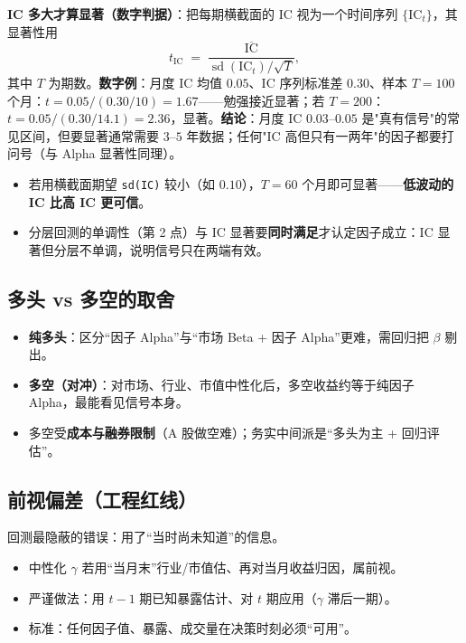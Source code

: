 \documentclass[UTF8,11pt]{ctexart}
\newcommand{\codeinl}[1]{\texttt{#1}}
\begin{document}
\textbf{IC 多大才算显著（数字判据）}：把每期横截面的 IC 视为一个时间序列 $\{\mathrm{IC}_t\}$，其显著性用
\begin{equation}
t_{\mathrm{IC}} \;=\; \frac{\overline{\mathrm{IC}}}{\operatorname{sd}(\mathrm{IC}_t)/\sqrt{T}},
\end{equation}
其中 $T$ 为期数。\textbf{数字例}：月度 IC 均值 $0.05$、IC 序列标准差 $0.30$、样本 $T=100$ 个月：$t=0.05/(0.30/10)=1.67$——勉强接近显著；若 $T=200$：$t=0.05/(0.30/14.1)=2.36$，显著。\textbf{结论}：月度 IC $0.03$--$0.05$ 是"真有信号"的常见区间，但要显著通常需要 $3$--$5$ 年数据；任何"IC 高但只有一两年"的因子都要打问号（与 Alpha 显著性同理）。
\begin{itemize}[itemsep=2pt]
\item 若用横截面期望 \codeinl{sd(IC)} 较小（如 $0.10$），$T=60$ 个月即可显著——\textbf{低波动的 IC 比高 IC 更可信}。
\item 分层回测的单调性（第 2 点）与 IC 显著要\textbf{同时满足}才认定因子成立：IC 显著但分层不单调，说明信号只在两端有效。
\end{itemize}

\subsection{多头 vs 多空的取舍}
\begin{itemize}[itemsep=2pt]
\item \textbf{纯多头}：区分“因子 Alpha”与“市场 Beta + 因子 Alpha”更难，需回归把 $\beta$ 剔出。
\item \textbf{多空（对冲）}：对市场、行业、市值中性化后，多空收益约等于纯因子 Alpha，最能看见信号本身。
\item 多空受\textbf{成本与融券限制}（A 股做空难）；务实中间派是“多头为主 + 回归评估”。
\end{itemize}

\subsection{前视偏差（工程红线）}
回测最隐蔽的错误：用了“当时尚未知道”的信息。
\begin{itemize}[itemsep=2pt]
\item 中性化 $\gamma$ 若用“当月末”行业/市值估、再对当月收益归因，属前视。
\item 严谨做法：用 $t-1$ 期已知暴露估计、对 $t$ 期应用（$\gamma$ 滞后一期）。
\item 标准：任何因子值、暴露、成交量在决策时刻必须“可用”。
\end{itemize}
\end{document}
